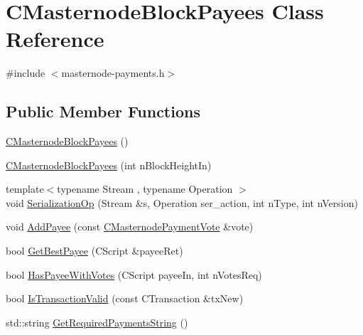 \hypertarget{class_c_masternode_block_payees}{}\section{C\+Masternode\+Block\+Payees Class Reference}
\label{class_c_masternode_block_payees}


{\ttfamily \#include $<$masternode-\/payments.\+h$>$}

\subsection*{Public Member Functions}
\begin{DoxyCompactItemize}
\item 
\mbox{\hyperlink{class_c_masternode_block_payees_a57cf1c21d11f8bda7da5282632b9528c}{C\+Masternode\+Block\+Payees}} ()
\item 
\mbox{\hyperlink{class_c_masternode_block_payees_a0b181e78ae9b160c146bc9e8d12d44b5}{C\+Masternode\+Block\+Payees}} (int n\+Block\+Height\+In)
\item 
{\footnotesize template$<$typename Stream , typename Operation $>$ }\\void \mbox{\hyperlink{class_c_masternode_block_payees_a482b77d8b758b21b4e6b0c8a0ef7a09f}{Serialization\+Op}} (Stream \&s, Operation ser\+\_\+action, int n\+Type, int n\+Version)
\item 
void \mbox{\hyperlink{class_c_masternode_block_payees_abce1347dcf4dc53a329f2dc338a77dc3}{Add\+Payee}} (const \mbox{\hyperlink{class_c_masternode_payment_vote}{C\+Masternode\+Payment\+Vote}} \&vote)
\item 
bool \mbox{\hyperlink{class_c_masternode_block_payees_a1b7d7842fa0102e17aaf4637b5815d04}{Get\+Best\+Payee}} (C\+Script \&payee\+Ret)
\item 
bool \mbox{\hyperlink{class_c_masternode_block_payees_a8e4492a6eb4154bd05a5a0d7b9fc5101}{Has\+Payee\+With\+Votes}} (C\+Script payee\+In, int n\+Votes\+Req)
\item 
bool \mbox{\hyperlink{class_c_masternode_block_payees_a6721f357d17e653ceb93c28ffd3ae528}{Is\+Transaction\+Valid}} (const C\+Transaction \&tx\+New)
\item 
std\+::string \mbox{\hyperlink{class_c_masternode_block_payees_a1026e555a9484567ea6cbfe8f90b428e}{Get\+Required\+Payments\+String}} ()
\end{DoxyCompactItemize}

